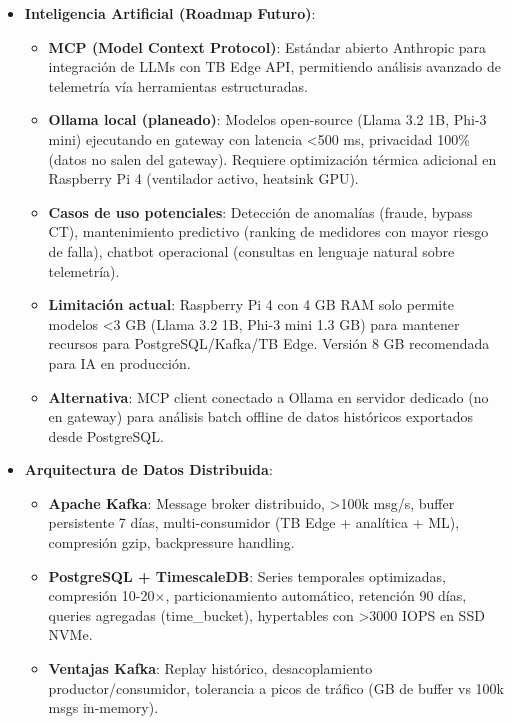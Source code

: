 \begin{itemize}
    \item \textbf{Inteligencia Artificial (Roadmap Futuro)}:
    \begin{itemize}
        \item \textbf{MCP (Model Context Protocol)}: Estándar abierto Anthropic para integración de LLMs con TB Edge API, permitiendo análisis avanzado de telemetría vía herramientas estructuradas.
        \item \textbf{Ollama local (planeado)}: Modelos open-source (Llama 3.2 1B, Phi-3 mini) ejecutando en gateway con latencia <500 ms, privacidad 100\% (datos no salen del gateway). Requiere optimización térmica adicional en Raspberry Pi 4 (ventilador activo, heatsink GPU).
        \item \textbf{Casos de uso potenciales}: Detección de anomalías (fraude, bypass CT), mantenimiento predictivo (ranking de medidores con mayor riesgo de falla), chatbot operacional (consultas en lenguaje natural sobre telemetría).
        \item \textbf{Limitación actual}: Raspberry Pi 4 con 4 GB RAM solo permite modelos <3 GB (Llama 3.2 1B, Phi-3 mini 1.3 GB) para mantener recursos para PostgreSQL/Kafka/TB Edge. Versión 8 GB recomendada para IA en producción.
        \item \textbf{Alternativa}: MCP client conectado a Ollama en servidor dedicado (no en gateway) para análisis batch offline de datos históricos exportados desde PostgreSQL.
    \end{itemize}
    
    \item \textbf{Arquitectura de Datos Distribuida}:
    \begin{itemize}
        \item \textbf{Apache Kafka}: Message broker distribuido, >100k msg/s, buffer persistente 7 días, multi-consumidor (TB Edge + analítica + ML), compresión gzip, backpressure handling.
        \item \textbf{PostgreSQL + TimescaleDB}: Series temporales optimizadas, compresión 10-20$\times$, particionamiento automático, retención 90 días, queries agregadas (time\_bucket), hypertables con >3000 IOPS en SSD NVMe.
        \item \textbf{Ventajas Kafka}: Replay histórico, desacoplamiento productor/consumidor, tolerancia a picos de tráfico (GB de buffer vs 100k msgs in-memory).
    \end{itemize}
    

\end{itemize}
